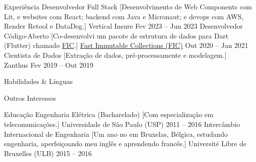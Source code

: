 \documentclass{llresume}
\begin{document}
\makeheader

\begin{mainpane}
    \begin{mainsection}{Experiência}
        \entryJob
            {Desenvolvedor Full Stack}
            [Desenvolvimento de Web Components com Lit, e websites com React; backend com Java e Micronaut; e devops com AWS, Render Retool e DataDog.]
            {Vertical Insure}
            {Fev 2023 -- Jun 2023}
        \entryJob
            {Desenvolvedor Código-Aberto}
            [Co-desenvolvi um pacote de estrutura de dados para Dart (Flutter) chamado \href{https://github.com/marcglasberg/fast_immutable_collections}{FIC}.]
            {\href{https://github.com/marcglasberg/fast_immutable_collections}{Fast Immutable Collections (FIC)}}
            {Out 2020 -- Jan 2021}
        \entryJob
            {Cientista de Dados}
            [Extração de dados, pré-processamente e modelagem.]
            {Zanthus}
            {Fev 2019 -- Out 2019}
    \end{mainsection}
    
    \begin{mainsection}{Habilidades \& Línguas}
    \end{mainsection}
    
    \begin{mainsection}{Outros Interesses}
    \end{mainsection}
    
    \begin{mainsection}{Educação}
        \entryJob
            {Engenharia Elétrica (Bacharelado)}
            [Com especialização em telecomunicações.]
            {Universidade de São Paulo (USP)}
            {2011 -- 2016}
        \entryJob
            {Intercâmbio Internacional de Engenharia}
            [Um ano no em Bruxelas, Bélgica, estudando engenharia, aperfeiçoando meu inglês e aprendendo francês.]
            {Université Libre de Bruxelles (ULB)}
            {2015 -- 2016}
    \end{mainsection}
    

\end{mainpane}
\end{document}
